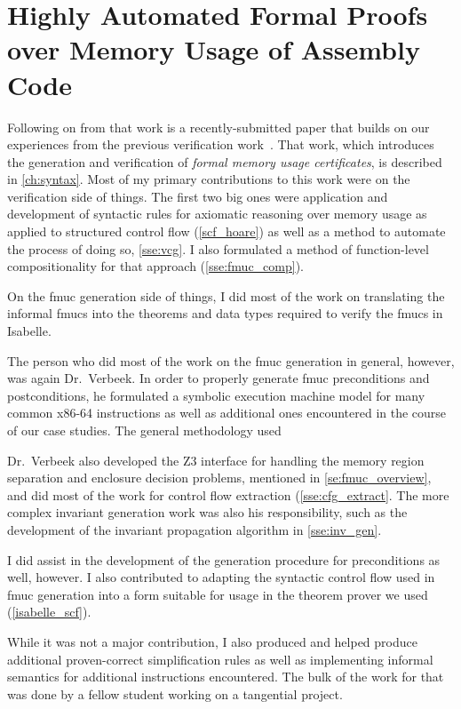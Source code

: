 \section*{Highly Automated Formal Proofs over Memory Usage of Assembly Code}
Following on from that work is a recently-submitted paper
that builds on our experiences from the previous verification
work~\citep{popl2019underreview}. That work,
which introduces the generation and verification of
\emph{formal memory usage certificates}, is described in \cref{ch:syntax}.
Most of my primary contributions to this work were on the verification side of things.
The first two big ones were application and development of syntactic rules
for axiomatic reasoning over memory usage
as applied to structured control flow (\cref{scf_hoare})
as well as a method to automate the process of doing so,  \cref{sse:vcg}.
I also formulated a method of function-level compositionality for that approach
(\cref{sse:fmuc_comp}).

On the \ac{fmuc} generation side of things,
I did most of the work on translating the informal \acp{fmuc}
into the theorems and data types required to verify the \acp{fmuc} in Isabelle.

The person who did most of the work on the \ac{fmuc} generation in general,
however, was again Dr.~Verbeek.
In order to properly generate \ac{fmuc} preconditions and postconditions,
he formulated a symbolic execution machine model for many common x86-64 instructions
as well as additional ones encountered in the course of our case studies.
The general methodology used 

Dr.~Verbeek also developed the Z3 interface
for handling the memory region separation and enclosure decision problems,
mentioned in \cref{se:fmuc_overview},
and did most of the work for control flow extraction (\cref{sse:cfg_extract}.
The more complex invariant generation work was also his responsibility,
such as the development of the invariant propagation algorithm in \cref{sse:inv_gen}.

I did assist in the development of the generation procedure for preconditions as well,
however.
I also contributed to adapting the syntactic control flow used in \ac{fmuc} generation
into a form suitable for usage in the theorem prover we used (\cref{isabelle_scf}).

While it was not a major contribution,
I also produced and helped produce additional proven-correct simplification rules
as well as implementing informal semantics for additional instructions encountered.
The bulk of the work for that was done by a fellow student
working on a tangential project.

